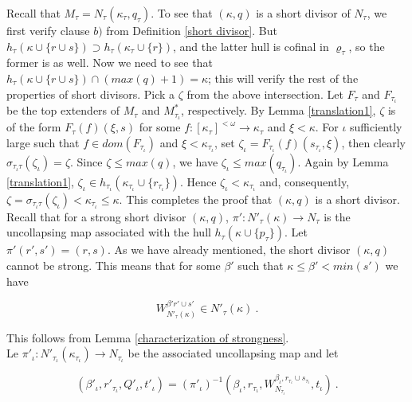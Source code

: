 \documentclass[12pt]{article}
\begin{document}
Recall that $M_\tau = N_\tau ( \kappa_\tau , q_\tau )$.  To see that $( \kappa , q )$ is a short divisor of $N_\tau$, we first verify clause $b)$ from Definition \ref{short divisor}.  But $h_\tau ( \kappa \cup \{ r \cup s \} ) \supset h_\tau ( \kappa_\tau \cup \{ r \} )$, and the latter hull is cofinal in $\varrho_\tau$, so the former is as well.  Now we need to see that $h_\tau ( \kappa \cup \{ r \cup s \} ) \cap ( max (q) +1 ) = \kappa$; this will verify the rest of the properties of short divisors.  Pick a $\zeta$ from the above intersection.  Let $F_\tau$ and $F_{\tau_\iota}$ be the top extenders of $M_\tau$ and $M_{\tau_\iota}^*$, respectively.  By Lemma \ref{translation1}, $\zeta$ is of the form $F_\tau (f) ( \xi , s )$ for some $f : [\kappa_\tau]^{< \omega} \longrightarrow \kappa_\tau$ and $\xi < \kappa$.  For $\iota$ sufficiently large such that $f \in dom ( F_{\tau_\iota})$ and $\xi < \kappa_{\tau_\iota}$, set $\zeta_\iota = F_{\tau_\iota} (f) (s_{\tau_\iota} , \xi )$, then clearly $\sigma_{\tau_\iota \tau } ( \zeta_\iota ) = \zeta$.  Since $\zeta \leq max (q)$, we have $\zeta_\iota \leq max ( q_{\tau_\iota})$.  Again by Lemma \ref{translation1}, $\zeta_\iota \in h_{\tau_\iota} ( \kappa_{\tau_\iota} \cup \{ r_{\tau_\iota} \} )$.  Hence $\zeta_\iota < \kappa_{\tau_\iota}$ and, consequently, $\zeta = \sigma_{\tau_\iota \tau} ( \zeta_\iota ) < \kappa_{\tau_\iota} \leq \kappa$.  This completes the proof that $( \kappa , q)$ is a short divisor.\\

Recall that for a strong short divisor $( \kappa , q)$,  $\pi' : N'_\tau ( \kappa ) \longrightarrow N_\tau$ is the uncollapsing map associated with the hull $h_\tau ( \kappa \cup \{ p_\tau \} )$.  Let $\pi' ( r' , s' ) = ( r , s )$.  As we have already mentioned, the short divisor $( \kappa , q)$ cannot be strong.  This means that for some $\beta'$ such that $\kappa \leq \beta' < min ( s' )$ we have

\[
W_{N'_{\tau} ( \kappa )}^{ \beta' r' \cup s' } \in N'_\tau ( \kappa ) \ .
\]

This follows from Lemma \ref{characterization of strongness}.\\



Le $\pi'_\iota : N'_{\tau_\iota} ( \kappa_{\tau_\iota} ) \longrightarrow N_{\tau_\iota}$ be the associated uncollapsing map and let

\[
( \beta'_\iota , r'_{\tau_\iota} , Q'_\iota , t'_\iota ) = (\pi'_\iota )^{-1} (\beta_\iota , r_{\tau_\iota} , W_{N_{\tau_\iota}}^{\beta_\iota , r_{\tau_\iota} \cup s_{\tau_\iota}} , t_\iota ) \ .
\]
\end{document}
